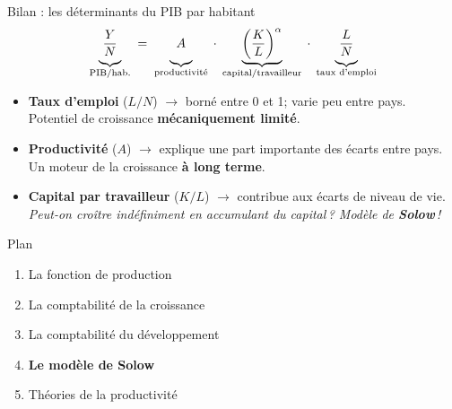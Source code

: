\documentclass[aspectratio=169]{beamer}
\begin{document}
\begin{frame}[t]{Bilan : les déterminants du PIB par habitant}
   \begin{equation*}
      \underbrace{\vphantom{\left(\frac{K}{L}\right)^{\alpha}}\frac{Y}{N}}_{\text{PIB/hab.}} \;=\; \underbrace{\vphantom{\left(\frac{K}{L}\right)^{\alpha}}A}_{\text{productivité}} \;\cdot\; \underbrace{\left(\frac{K}{L}\right)^{\alpha}}_{\text{capital/travailleur}} \;\cdot\; \underbrace{\vphantom{\left(\frac{K}{L}\right)^{\alpha}}\frac{L}{N}}_{\text{taux d'emploi}}
   \end{equation*}
   \vspace{0.1cm}
   \begin{itemize}
      \setlength\itemsep{0.35cm}
      \item \textbf{Taux d'emploi} ($L / N$) $\to$ borné entre 0 et 1; varie peu entre pays. \\ \textcolor{HECgray}{Potentiel de croissance \textbf{mécaniquement limité}.}
      \item \textbf{Productivité} ($A$) $\to$ explique une part importante des écarts entre pays. \\ \textcolor{HECgray}{Un moteur de la croissance \textbf{à long terme}.}
      \item \textbf{Capital par travailleur} ($K / L$) $\to$ contribue aux écarts de niveau de vie. \\ \textcolor{HECcoral}{\textit{Peut-on croître indéfiniment en accumulant du capital\,? Modèle de \textbf{Solow}\,!}}
   \end{itemize}
\end{frame}

\begin{frame}{Plan}
   \begin{enumerate}
      \setlength\itemsep{0.3cm}
      \item {\color{gray!50}La fonction de production}
      \item {\color{gray!50}La comptabilité de la croissance}
      \item {\color{gray!50}La comptabilité du développement}
      \item \textbf{Le modèle de Solow}
      \item Théories de la productivité
   \end{enumerate}
\end{frame}
\end{document}
